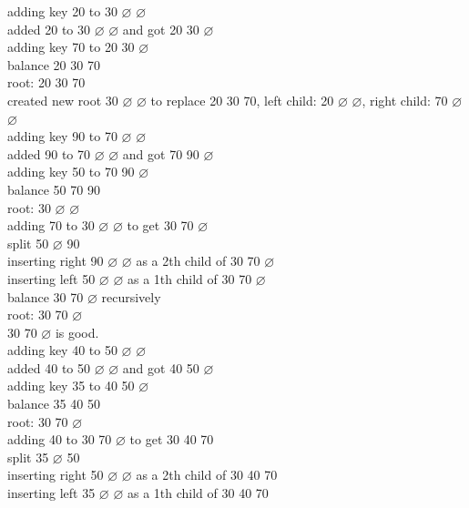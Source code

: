 \documentclass[a4paper,12pt]{article}
\begin{document}
adding key 20 to 30 \(\varnothing\) \(\varnothing\)\\[0pt]
added 20 to 30 \(\varnothing\) \(\varnothing\) and got 20 30 \(\varnothing\)\\[0pt]
adding key 70 to 20 30 \(\varnothing\)\\[0pt]
balance 20 30 70\\[0pt]
root: 20 30 70\\[0pt]
created new root 30 \(\varnothing\) \(\varnothing\) to replace 20 30 70, left child: 20 \(\varnothing\) \(\varnothing\), right child: 70 \(\varnothing\) \(\varnothing\)\\[0pt]
adding key 90 to 70 \(\varnothing\) \(\varnothing\)\\[0pt]
added 90 to 70 \(\varnothing\) \(\varnothing\) and got 70 90 \(\varnothing\)\\[0pt]
adding key 50 to 70 90 \(\varnothing\)\\[0pt]
balance 50 70 90\\[0pt]
root: 30 \(\varnothing\) \(\varnothing\)\\[0pt]
adding 70 to 30 \(\varnothing\) \(\varnothing\) to get 30 70 \(\varnothing\)\\[0pt]
split 50 \(\varnothing\) 90\\[0pt]
inserting right 90 \(\varnothing\) \(\varnothing\) as a 2th child of 30 70 \(\varnothing\)\\[0pt]
inserting left 50 \(\varnothing\) \(\varnothing\) as a 1th child of 30 70 \(\varnothing\)\\[0pt]
balance 30 70 \(\varnothing\) recursively\\[0pt]
root: 30 70 \(\varnothing\)\\[0pt]
30 70 \(\varnothing\) is good.\\[0pt]
adding key 40 to 50 \(\varnothing\) \(\varnothing\)\\[0pt]
added 40 to 50 \(\varnothing\) \(\varnothing\) and got 40 50 \(\varnothing\)\\[0pt]
adding key 35 to 40 50 \(\varnothing\)\\[0pt]
balance 35 40 50\\[0pt]
root: 30 70 \(\varnothing\)\\[0pt]
adding 40 to 30 70 \(\varnothing\) to get 30 40 70\\[0pt]
split 35 \(\varnothing\) 50\\[0pt]
inserting right 50 \(\varnothing\) \(\varnothing\) as a 2th child of 30 40 70\\[0pt]
inserting left 35 \(\varnothing\) \(\varnothing\) as a 1th child of 30 40 70\\[0pt]
\end{document}
